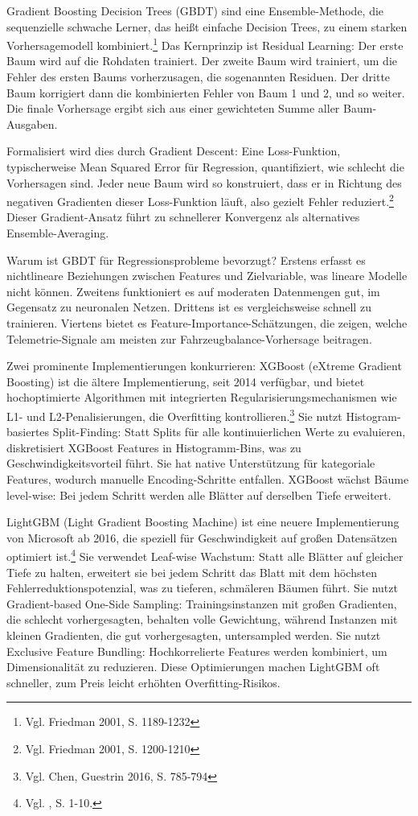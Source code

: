 Gradient Boosting Decision Trees (GBDT) sind eine Ensemble-Methode, die sequenzielle schwache Lerner, das heißt einfache Decision Trees, zu einem starken Vorhersagemodell kombiniert.\footnote{Vgl. Friedman 2001, S. 1189-1232} Das Kernprinzip ist Residual Learning: Der erste Baum wird auf die Rohdaten trainiert. Der zweite Baum wird trainiert, um die Fehler des ersten Baums vorherzusagen, die sogenannten Residuen. Der dritte Baum korrigiert dann die kombinierten Fehler von Baum 1 und 2, und so weiter. Die finale Vorhersage ergibt sich aus einer gewichteten Summe aller Baum-Ausgaben.

Formalisiert wird dies durch Gradient Descent: Eine Loss-Funktion, typischerweise Mean Squared Error für Regression, quantifiziert, wie schlecht die Vorhersagen sind. Jeder neue Baum wird so konstruiert, dass er in Richtung des negativen Gradienten dieser Loss-Funktion läuft, also gezielt Fehler reduziert.\footnote{Vgl. Friedman 2001, S. 1200-1210} Dieser Gradient-Ansatz führt zu schnellerer Konvergenz als alternatives Ensemble-Averaging.

Warum ist GBDT für Regressionsprobleme bevorzugt? Erstens erfasst es nichtlineare Beziehungen zwischen Features und Zielvariable, was lineare Modelle nicht können. Zweitens funktioniert es auf moderaten Datenmengen gut, im Gegensatz zu neuronalen Netzen. Drittens ist es vergleichsweise schnell zu trainieren. Viertens bietet es Feature-Importance-Schätzungen, die zeigen, welche Telemetrie-Signale am meisten zur Fahrzeugbalance-Vorhersage beitragen.

Zwei prominente Implementierungen konkurrieren: XGBoost (eXtreme Gradient Boosting) ist die ältere Implementierung, seit 2014 verfügbar, und bietet hochoptimierte Algorithmen mit integrierten Regularisierungsmechanismen wie L1- und L2-Penalisierungen, die Overfitting kontrollieren.\footnote{Vgl. Chen, Guestrin 2016, S. 785-794} Sie nutzt Histogram-basiertes Split-Finding: Statt Splits für alle kontinuierlichen Werte zu evaluieren, diskretisiert XGBoost Features in Histogramm-Bins, was zu Geschwindigkeitsvorteil führt. Sie hat native Unterstützung für kategoriale Features, wodurch manuelle Encoding-Schritte entfallen. XGBoost wächst Bäume level-wise: Bei jedem Schritt werden alle Blätter auf derselben Tiefe erweitert.

LightGBM (Light Gradient Boosting Machine) ist eine neuere Implementierung von Microsoft ab 2016, die speziell für Geschwindigkeit auf großen Datensätzen optimiert ist.\footnote{Vgl. \cite{Ke2017}, S. 1-10.} Sie verwendet Leaf-wise Wachstum: Statt alle Blätter auf gleicher Tiefe zu halten, erweitert sie bei jedem Schritt das Blatt mit dem höchsten Fehlerreduktionspotenzial, was zu tieferen, schmäleren Bäumen führt. Sie nutzt Gradient-based One-Side Sampling: Trainingsinstanzen mit großen Gradienten, die schlecht vorhergesagten, behalten volle Gewichtung, während Instanzen mit kleinen Gradienten, die gut vorhergesagten, untersampled werden. Sie nutzt Exclusive Feature Bundling: Hochkorrelierte Features werden kombiniert, um Dimensionalität zu reduzieren. Diese Optimierungen machen LightGBM oft schneller, zum Preis leicht erhöhten Overfitting-Risikos.

